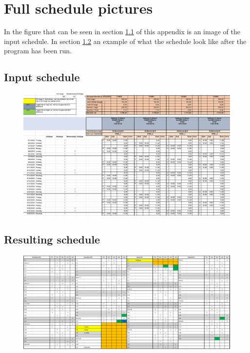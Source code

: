 \chapter{Full schedule pictures}\label{appendix:schedules}
In the figure that can be seen in section \ref{section:ap-b1} of this appendix is an image of the input schedule. In section \ref{section:ap-b2} an example of what the schedule look like after the program has been run.

\clearpage
\section{Input schedule}
\label{section:ap-b1}
\begin{figure}[hb!]
    \centering
    \includegraphics[angle=-90,origin=c,width=\textwidth-32pt]{sections/appendices/Schedules/Template.png}
    \label{fig:appendixTemplate}
\end{figure}

\clearpage
\section{Resulting schedule}
\label{section:ap-b2}
\begin{figure}[hb!]
    \centering
    \includegraphics[angle=-90,origin=c,width=\textwidth-106pt]{sections/appendices/Schedules/Fixed.png}
    \label{fig:appendixFixed}
\end{figure}
